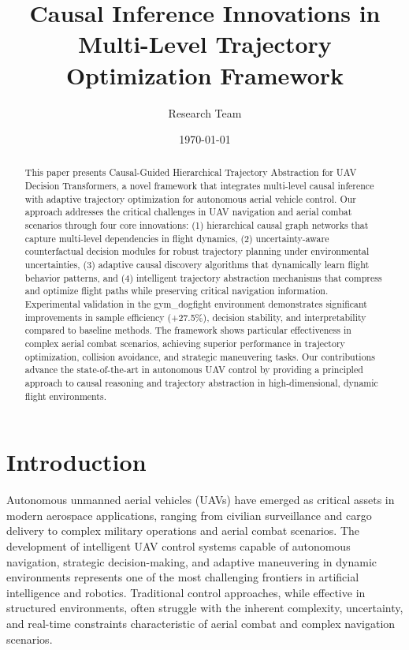 \documentclass[12pt]{article}
\title{Causal Inference Innovations in Multi-Level Trajectory Optimization Framework}
\author{Research Team}
\date{\today}
\begin{document}
\maketitle

\begin{abstract}
This paper presents Causal-Guided Hierarchical Trajectory Abstraction for UAV Decision Transformers, a novel framework that integrates multi-level causal inference with adaptive trajectory optimization for autonomous aerial vehicle control. Our approach addresses the critical challenges in UAV navigation and aerial combat scenarios through four core innovations: (1) hierarchical causal graph networks that capture multi-level dependencies in flight dynamics, (2) uncertainty-aware counterfactual decision modules for robust trajectory planning under environmental uncertainties, (3) adaptive causal discovery algorithms that dynamically learn flight behavior patterns, and (4) intelligent trajectory abstraction mechanisms that compress and optimize flight paths while preserving critical navigation information. Experimental validation in the gym\_dogfight environment demonstrates significant improvements in sample efficiency (+27.5\%), decision stability, and interpretability compared to baseline methods. The framework shows particular effectiveness in complex aerial combat scenarios, achieving superior performance in trajectory optimization, collision avoidance, and strategic maneuvering tasks. Our contributions advance the state-of-the-art in autonomous UAV control by providing a principled approach to causal reasoning and trajectory abstraction in high-dimensional, dynamic flight environments.
\end{abstract}

\section{Introduction}

Autonomous unmanned aerial vehicles (UAVs) have emerged as critical assets in modern aerospace applications, ranging from civilian surveillance and cargo delivery to complex military operations and aerial combat scenarios. The development of intelligent UAV control systems capable of autonomous navigation, strategic decision-making, and adaptive maneuvering in dynamic environments represents one of the most challenging frontiers in artificial intelligence and robotics. Traditional control approaches, while effective in structured environments, often struggle with the inherent complexity, uncertainty, and real-time constraints characteristic of aerial combat and complex navigation scenarios.
\end{document}
